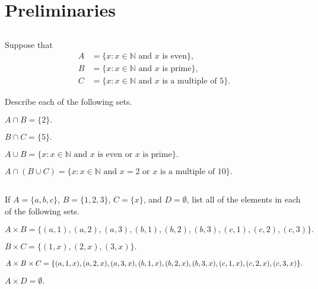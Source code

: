 \chapter{Preliminaries}\label{ch:preliminaries}

\section{}\label{sec:1-1}

Suppose that
\begin{align*}
A &= \{ x : x \in \mathbb{N} \text{ and } x \text{ is even}\}, \\
B &= \{ x : x \in \mathbb{N} \text{ and } x \text{ is prime}\}, \\
C &= \{ x : x \in \mathbb{N} \text{ and } x \text{ is a multiple of 5}\}.
\end{align*}

Describe each of the following sets.
\hr
\begin{exlist}
    \item $A \cap B = \{ 2 \}.$
    \item $B \cap C = \{ 5 \}.$
    \item $A \cup B = \{ x : x \in \mathbb{N} \text{ and } x \text{ is even or } x \text{ is prime}\}.$
    \item $A \cap (B \cup C) = \{ x : x \in \mathbb{N} \text{ and } x = 2 \text{ or } x \text{ is a multiple of 10}\}.$
\end{exlist}

\section{}\label{sec:1-2}

If $A = \{ a, b, c \}$, $B = \{ 1, 2, 3 \}$, $C = \{ x \}$, and $D = \emptyset$, list all of the elements in each of the following sets.
\hr
\begin{exlist}
    \item $A \times B = \{ (a,1), (a,2), (a,3), (b,1), (b,2), (b,3), (c,1), (c,2), (c,3)\}.$
    \item $B \times C = \{ (1,x), (2,x), (3,x)\}.$
    \item $A \times B \times C = \{ (a,1,x), (a,2,x), (a,3,x), (b,1,x), (b,2,x), (b,3,x), \\(c,1,x), (c,2,x), (c,3,x)\}.$
    \item $A \times D = \emptyset.$
\end{exlist}
\pagebreak
\section{}\label{sec:1-3}

